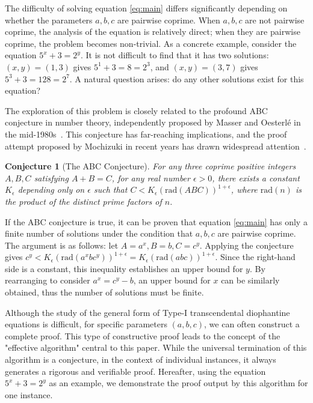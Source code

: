 \documentclass{article}
\newtheorem{conjecture}[theorem]{Conjecture}
\begin{document}
The difficulty of solving equation \eqref{eq:main} differs significantly depending on whether the parameters $a,b,c$ are pairwise coprime. When $a,b,c$ are not pairwise coprime, the analysis of the equation is relatively direct; when they are pairwise coprime, the problem becomes non-trivial. As a concrete example, consider the equation $5^x+3=2^y$. It is not difficult to find that it has two solutions: $(x, y)=(1, 3)$ gives $5^1+3=8=2^3$, and $(x, y)=(3, 7)$ gives $5^3+3=128=2^7$. A natural question arises: do any other solutions exist for this equation?

The exploration of this problem is closely related to the profound ABC conjecture in number theory, independently proposed by Masser and Oesterlé in the mid-1980s~\cite{SB_1987-1988__30__165_0}. This conjecture has far-reaching implications, and the proof attempt proposed by Mochizuki in recent years has drawn widespread attention~\cite{mochizuki2021inter}.

\begin{conjecture}[The ABC Conjecture]
For any three coprime positive integers $A, B, C$ satisfying $A+B=C$, for any real number $\epsilon > 0$, there exists a constant $K_\epsilon$ depending only on $\epsilon$ such that $C < K_\epsilon (\text{rad}(ABC))^{1+\epsilon}$, where $\text{rad}(n)$ is the product of the distinct prime factors of $n$.
\end{conjecture}

If the ABC conjecture is true, it can be proven that equation \eqref{eq:main} has only a finite number of solutions under the condition that $a,b,c$ are pairwise coprime. The argument is as follows: let $A=a^x, B=b, C=c^y$. Applying the conjecture gives $c^y < K_\epsilon (\text{rad}(a^x b c^y))^{1+\epsilon} = K_\epsilon (\text{rad}(abc))^{1+\epsilon}$. Since the right-hand side is a constant, this inequality establishes an upper bound for $y$. By rearranging to consider $a^x = c^y - b$, an upper bound for $x$ can be similarly obtained, thus the number of solutions must be finite.

Although the study of the general form of Type-I transcendental diophantine equations is difficult, for specific parameters $(a,b,c)$, we can often construct a complete proof. This type of constructive proof leads to the concept of the "effective algorithm" central to this paper. While the universal termination of this algorithm is a conjecture, in the context of individual instances, it always generates a rigorous and verifiable proof. Hereafter, using the equation $5^x+3=2^y$ as an example, we demonstrate the proof output by this algorithm for one instance.
\end{document}
